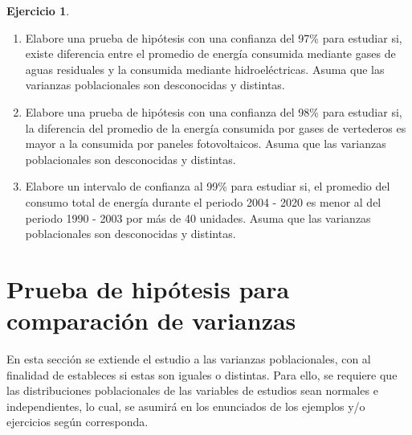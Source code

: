 \documentclass[
  11pt,
]{book}
\theoremstyle{definition}
\theoremstyle{definition}
\theoremstyle{definition}
\newtheorem{exercise}{Ejercicio}[chapter]
\theoremstyle{definition}
\theoremstyle{remark}
\begin{document}
\begin{exercise}
\begin{enumerate}
\def\labelenumi{\arabic{enumi}.}
\item
  Elabore una prueba de hipótesis con una confianza del 97\% para estudiar si, existe diferencia entre el promedio de energía consumida mediante gases de aguas residuales y la consumida mediante hidroeléctricas. Asuma que las varianzas poblacionales son desconocidas y distintas.
\item
  Elabore una prueba de hipótesis con una confianza del 98\% para estudiar si, la diferencia del promedio de la energía consumida por gases de vertederos es mayor a la consumida por paneles fotovoltaicos. Asuma que las varianzas poblacionales son desconocidas y distintas.
\item
  Elabore un intervalo de confianza al 99\% para estudiar si, el promedio del consumo total de energía durante el periodo 2004 - 2020 es menor al del periodo 1990 - 2003 por más de 40 unidades. Asuma que las varianzas poblacionales son desconocidas y distintas.
\end{enumerate}

\end{exercise}

\section{Prueba de hipótesis para comparación de varianzas}\label{prueba-de-hipotesis-comparacion-varianzas}

En esta sección se extiende el estudio a las varianzas poblacionales, con al finalidad de estableces si estas son iguales o distintas. Para ello, se requiere que las distribuciones poblacionales de las variables de estudios sean normales e independientes, lo cual, se asumirá en los enunciados de los ejemplos y/o ejercicios según corresponda.
\end{document}
